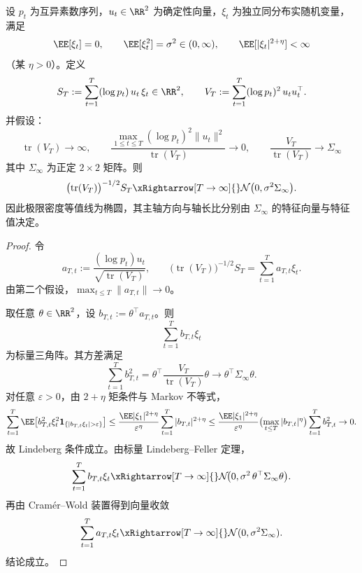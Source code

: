 \begin{theorem}[素数加权二维读出的椭圆型高斯极限指纹]\label{thm:killo-prime-weighted-elliptic-fingerprint-clt}
设 \(p_t\) 为互异素数序列，\(u_t\in\RR^2\) 为确定性向量，\(\xi_t\) 为独立同分布实随机变量，满足
\[
\EE[\xi_t]=0,\qquad
\EE[\xi_t^2]=\sigma^2\in(0,\infty),\qquad
\EE[|\xi_t|^{2+\eta}]<\infty
\]
（某 \(\eta>0\)）。定义
\[
S_T:=\sum_{t=1}^T (\log p_t)\,u_t\,\xi_t\in\RR^2,
\qquad
V_T:=\sum_{t=1}^T (\log p_t)^2\,u_tu_t^\top.
\]
并假设：
\[
\operatorname{tr}(V_T)\to\infty,\qquad
\frac{\max_{1\le t\le T}(\log p_t)^2\|u_t\|^2}{\operatorname{tr}(V_T)}\to 0,\qquad
\frac{V_T}{\operatorname{tr}(V_T)}\to \Sigma_\infty
\]
其中 \(\Sigma_\infty\) 为正定 \(2\times2\) 矩阵。则
\[
\bigl(\operatorname{tr}(V_T)\bigr)^{-1/2}S_T
\xRightarrow[T\to\infty]{}
\mathcal N\bigl(0,\sigma^2\Sigma_\infty\bigr).
\]
因此极限密度等值线为椭圆，其主轴方向与轴长比分别由 \(\Sigma_\infty\) 的特征向量与特征值决定。
\end{theorem}
\begin{proof}
令
\[
a_{T,t}:=\frac{(\log p_t)u_t}{\sqrt{\operatorname{tr}(V_T)}},
\qquad
\bigl(\operatorname{tr}(V_T)\bigr)^{-1/2}S_T=\sum_{t=1}^T a_{T,t}\xi_t.
\]
由第二个假设，\(\max_{t\le T}\|a_{T,t}\|\to 0\)。

取任意 \(\theta\in\RR^2\)，设 \(b_{T,t}:=\theta^\top a_{T,t}\)。则
\[
\sum_{t=1}^T b_{T,t}\xi_t
\]
为标量三角阵。其方差满足
\[
\sum_{t=1}^T b_{T,t}^2
=\theta^\top\frac{V_T}{\operatorname{tr}(V_T)}\theta
\longrightarrow
\theta^\top\Sigma_\infty\theta.
\]
对任意 \(\varepsilon>0\)，由 \(2+\eta\) 矩条件与 Markov 不等式，
\[
\sum_{t=1}^T\EE\!\left[b_{T,t}^2\xi_t^2\mathbf 1_{\{|b_{T,t}\xi_t|>\varepsilon\}}\right]
\le
\frac{\EE|\xi_1|^{2+\eta}}{\varepsilon^\eta}\sum_{t=1}^T|b_{T,t}|^{2+\eta}
\le
\frac{\EE|\xi_1|^{2+\eta}}{\varepsilon^\eta}
\bigl(\max_{t\le T}|b_{T,t}|^\eta\bigr)\sum_{t=1}^T b_{T,t}^2
\to 0.
\]
故 Lindeberg 条件成立。由标量 Lindeberg--Feller 定理，
\[
\sum_{t=1}^T b_{T,t}\xi_t
\xRightarrow[T\to\infty]{}
\mathcal N\!\bigl(0,\sigma^2\,\theta^\top\Sigma_\infty\theta\bigr).
\]
再由 Cram\'er--Wold 装置得到向量收敛
\[
\sum_{t=1}^T a_{T,t}\xi_t
\xRightarrow[T\to\infty]{}
\mathcal N(0,\sigma^2\Sigma_\infty).
\]
结论成立。
\end{proof}

